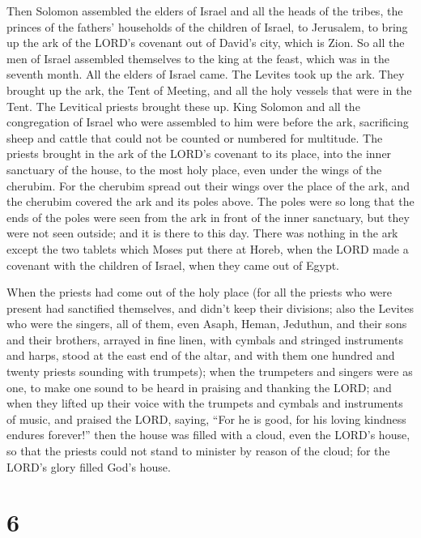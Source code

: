  Then Solomon assembled the elders of Israel and all the
heads of the tribes, the princes of the fathers' households of the
children of Israel, to Jerusalem, to bring up the ark of the LORD's
covenant out of David's city, which is Zion.  So all the men
of Israel assembled themselves to the king at the feast, which was in
the seventh month.  All the elders of Israel came. The
Levites took up the ark.  They brought up the ark, the Tent
of Meeting, and all the holy vessels that were in the Tent. The
Levitical priests brought these up.  King Solomon and all
the congregation of Israel who were assembled to him were before the
ark, sacrificing sheep and cattle that could not be counted or numbered
for multitude.  The priests brought in the ark of the LORD's
covenant to its place, into the inner sanctuary of the house, to the
most holy place, even under the wings of the cherubim.  For
the cherubim spread out their wings over the place of the ark, and the
cherubim covered the ark and its poles above.  The poles
were so long that the ends of the poles were seen from the ark in front
of the inner sanctuary, but they were not seen outside; and it is there
to this day.  There was nothing in the ark except the two
tablets which Moses put there at Horeb, when the LORD made a covenant
with the children of Israel, when they came out of Egypt.

 When the priests had come out of the holy place (for all
the priests who were present had sanctified themselves, and didn't keep
their divisions;  also the Levites who were the singers,
all of them, even Asaph, Heman, Jeduthun, and their sons and their
brothers, arrayed in fine linen, with cymbals and stringed instruments
and harps, stood at the east end of the altar, and with them one hundred
and twenty priests sounding with trumpets);  when the
trumpeters and singers were as one, to make one sound to be heard in
praising and thanking the LORD; and when they lifted up their voice with
the trumpets and cymbals and instruments of music, and praised the LORD,
saying, ``For he is good, for his loving kindness endures forever!''
then the house was filled with a cloud, even the LORD's house,
 so that the priests could not stand to minister by reason
of the cloud; for the LORD's glory filled God's house.

\hypertarget{section-5}{%
\section{6}\label{section-5}}

